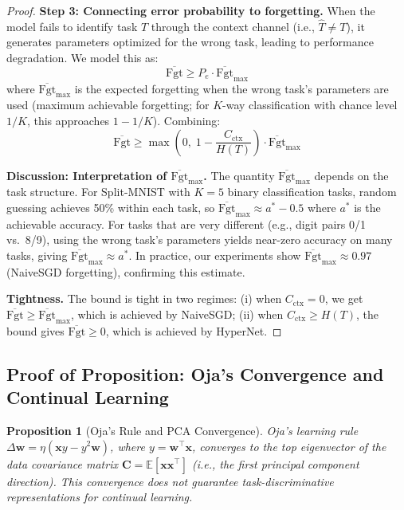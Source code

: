 \documentclass{article}
\newtheorem{proposition}[theorem]{Proposition}
\begin{document}
\begin{proof}
\textbf{Step 3: Connecting error probability to forgetting.}
When the model fails to identify task $T$ through the context channel (i.e., $\hat{T} \neq T$), it generates parameters optimized for the wrong task, leading to performance degradation. We model this as:
\begin{equation}
    \overline{\mathrm{Fgt}} \geq P_e \cdot \overline{\mathrm{Fgt}}_\mathrm{max}
\end{equation}
where $\overline{\mathrm{Fgt}}_\mathrm{max}$ is the expected forgetting when the wrong task's parameters are used (maximum achievable forgetting; for $K$-way classification with chance level $1/K$, this approaches $1 - 1/K$). Combining:
\begin{equation}
    \overline{\mathrm{Fgt}} \geq \max\left(0,\; 1 - \frac{C_\mathrm{ctx}}{H(T)}\right) \cdot \overline{\mathrm{Fgt}}_\mathrm{max}
\end{equation}

\textbf{Discussion: Interpretation of $\overline{\mathrm{Fgt}}_\mathrm{max}$.}
The quantity $\overline{\mathrm{Fgt}}_\mathrm{max}$ depends on the task structure. For Split-MNIST with $K=5$ binary classification tasks, random guessing achieves 50\% within each task, so $\overline{\mathrm{Fgt}}_\mathrm{max} \approx a^* - 0.5$ where $a^*$ is the achievable accuracy. For tasks that are very different (e.g., digit pairs 0/1 vs.\ 8/9), using the wrong task's parameters yields near-zero accuracy on many tasks, giving $\overline{\mathrm{Fgt}}_\mathrm{max} \approx a^*$. In practice, our experiments show $\overline{\mathrm{Fgt}}_\mathrm{max} \approx 0.97$ (NaiveSGD forgetting), confirming this estimate.

\textbf{Tightness.} The bound is tight in two regimes: (i) when $C_\mathrm{ctx} = 0$, we get $\overline{\mathrm{Fgt}} \geq \overline{\mathrm{Fgt}}_\mathrm{max}$, which is achieved by NaiveSGD; (ii) when $C_\mathrm{ctx} \geq H(T)$, the bound gives $\overline{\mathrm{Fgt}} \geq 0$, which is achieved by HyperNet.
\end{proof}


\subsection{Proof of Proposition: Oja's Convergence and Continual Learning}
\label{app:proof_oja}

\begin{proposition}[Oja's Rule and PCA Convergence]
\label{prop:oja}
Oja's learning rule $\Delta \mathbf{w} = \eta(\mathbf{x}y - y^2\mathbf{w})$, where $y = \mathbf{w}^\top \mathbf{x}$, converges to the top eigenvector of the data covariance matrix $\mathbf{C} = \mathbb{E}[\mathbf{x}\mathbf{x}^\top]$ (i.e., the first principal component direction). This convergence does not guarantee task-discriminative representations for continual learning.
\end{proposition}
\end{document}
